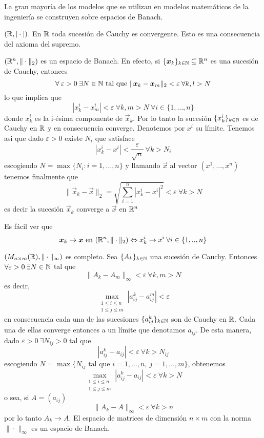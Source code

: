 \begin{nota}
La gran mayor\'ia de los modelos que se utilizan en modelos matem\'aticos de la ingenier\'ia se construyen sobre espacios de Banach.
\end{nota}

\begin{ejemplo}
$(\mathbb{R},|\cdot|)$. En $\mathbb{R}$ toda sucesi\'on de Cauchy es convergente. Esto es una consecuencia del axioma del supremo.
\end{ejemplo}

\begin{ejemplo}
$(\mathbb{R}^n,\|\cdot\|_2)$ es un espacio de Banach. En efecto, si $\{\boldsymbol{x}_k\}_{k\in\mathbb{N}}\subseteq \mathbb{R}^n$ es una sucesi\'on de Cauchy, entonces
$$\forall\:\varepsilon >0\: \exists N\in\mathbb{N} \text{ tal que } \|\boldsymbol{x}_k-\boldsymbol{x}_m\|_2<\varepsilon\: \forall k,l>N$$ 
lo que implica que
$$|x_k^i-x_m^i|<\varepsilon \:\forall k,m>N\: \forall i\in\{1,\dots,n\}$$ 
donde $x_k^i$ es la i-\'esima componente de $\vec{x}_k$. Por lo tanto la sucesi\'on $\{x_k^i\}_{k\in\mathbb{N}}$ es de Cauchy en $\mathbb{R}$ y en consecuencia converge. Denotemos por $x^i$ su l\'imite. Tenemos asi que dado $\varepsilon>0$ existe $N_i$ que satisface 
$$|x_k^i-x^i|<\frac{\varepsilon}{\sqrt{n}}\: \forall k>N_i$$
escogiendo $N= \max\{N_i : i=1,\ldots,n\}$ y llamando $\vec{x}$ al vector $(x^1,\ldots,x^n)$ tenemos finalmente que
$$\|\vec{x}_k-\vec{x}\|_2=\sqrt{\sum_{i=1}^n|x_k^i -x^i|^2}<\varepsilon\: \forall k>N$$ 
es decir la sucesi\'on $\vec{x}_k$ converge a $\vec{x}$ en $\mathbb{R}^n$
\end{ejemplo}

\begin{nota}
Es f\'acil ver que
$$\boldsymbol{x}_k\rightarrow \boldsymbol{x} \text{ en } (\mathbb{R}^n,\|\cdot\|_2)\Leftrightarrow x_k^i\rightarrow x^i \:\forall i\in\{1,..,n\}$$
\end{nota}

\begin{ejemplo}
$(M_{n\times m}(\mathbb{R}),\|\cdot\|_\infty)$ es completo. Sea $\{A_k\}_{k\in \mathbb{N}}$ una sucesi\'on de Cauchy. Entonces $\forall\varepsilon >0\:\exists N\in\mathbb{N}$ tal que
$$\|A_k-A_m\|_\infty <\varepsilon\: \forall k,m>N$$ 
es decir,
$$\max_{\substack{1\leq i\leq n\\1\leq j\leq m}}{|a_{ij}^k-a_{ij}^m|}<\varepsilon$$ 
en consecuencia cada una de las sucesiones $\{a_{ij}^k\}_{k\in \mathbb{N}}$ son de Cauchy en $\mathbb{R}$. Cada una de ellas converge entonces a un l\'imite que denotamos
$a_{ij}$. De esta manera, dado $\varepsilon >0\:\exists N_{ij}>0$ tal que
$$|a_{ij}^k-a_{ij}|<\varepsilon \:\forall k>N_{ij}$$ 
escogiendo $N=\max\{N_{ij} \text{ tal que } i=1,\ldots,n,\:j=1,\ldots,m\}$, obtenemos
$$\max_{\substack{1\leq i\leq n\\1\leq j\leq m}}{|a_{ij}^k-a_{ij}|}<\varepsilon\: \forall k>N$$ 
o sea, si $A=(a_{ij})$ 
$$\|A_k-A\|_\infty <\varepsilon\:\forall k>n$$ 
por lo tanto $A_k\rightarrow A$. El espacio de matrices de dimensi\'on $n\times m$ con la norma $\|\cdot\|_\infty$ es un espacio de Banach.
\end{ejemplo}


